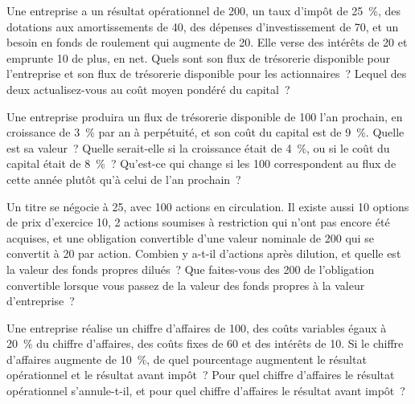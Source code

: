 \begin{question}\label{iq:iv2:valuation-and-financial-statements:4}
Une entreprise a un résultat opérationnel de 200, un taux d'impôt de 25~\%, des dotations aux amortissements de 40, des dépenses d'investissement de 70, et un besoin en fonds de roulement qui augmente de 20. Elle verse des intérêts de 20 et emprunte 10 de plus, en net. Quels sont son flux de trésorerie disponible pour l'entreprise et son flux de trésorerie disponible pour les actionnaires~? Lequel des deux actualisez-vous au coût moyen pondéré du capital~?
\end{question}

\begin{question}\label{iq:iv2:valuation-and-financial-statements:5}
Une entreprise produira un flux de trésorerie disponible de 100 l'an prochain, en croissance de 3~\% par an à perpétuité, et son coût du capital est de 9~\%. Quelle est sa valeur~? Quelle serait-elle si la croissance était de 4~\%, ou si le coût du capital était de 8~\%~? Qu'est-ce qui change si les 100 correspondent au flux de cette année plutôt qu'à celui de l'an prochain~?
\end{question}

\begin{question}\label{iq:iv2:valuation-and-financial-statements:6}
Un titre se négocie à 25, avec 100 actions en circulation. Il existe aussi 10 options de prix d'exercice 10, 2 actions soumises à restriction qui n'ont pas encore été acquises, et une obligation convertible d'une valeur nominale de 200 qui se convertit à 20 par action. Combien y a-t-il d'actions après dilution, et quelle est la valeur des fonds propres dilués~? Que faites-vous des 200 de l'obligation convertible lorsque vous passez de la valeur des fonds propres à la valeur d'entreprise~?
\end{question}

\begin{question}\label{iq:iv2:valuation-and-financial-statements:7}
Une entreprise réalise un chiffre d'affaires de 100, des coûts variables égaux à 20~\% du chiffre d'affaires, des coûts fixes de 60 et des intérêts de 10. Si le chiffre d'affaires augmente de 10~\%, de quel pourcentage augmentent le résultat opérationnel et le résultat avant impôt~? Pour quel chiffre d'affaires le résultat opérationnel s'annule-t-il, et pour quel chiffre d'affaires le résultat avant impôt~?
\end{question}

